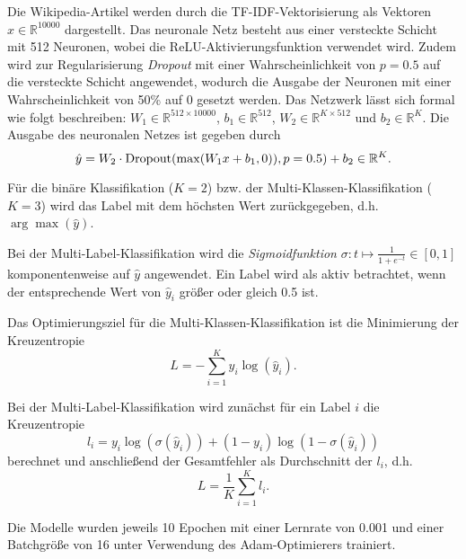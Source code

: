 Die Wikipedia-Artikel werden durch die TF-IDF-Vektorisierung als Vektoren $x\in\mathbb{R}^{10000}$ dargestellt. Das neuronale Netz besteht aus einer versteckte Schicht mit 512 Neuronen, wobei die ReLU-Aktivierungsfunktion verwendet wird. Zudem wird zur Regularisierung \textit{Dropout} mit einer Wahrscheinlichkeit von $p=0.5$ auf die versteckte Schicht angewendet, wodurch die Ausgabe der Neuronen mit einer Wahrscheinlichkeit von 50\% auf 0 gesetzt werden. Das Netzwerk lässt sich formal wie folgt beschreiben: $W_1\in\mathbb{R}^{512\times 10000}$, $b_1\in\mathbb{R}^{512}$, $W_2\in\mathbb{R}^{K\times 512}$ und $b_2\in\mathbb{R}^{K}$. Die Ausgabe des neuronalen Netzes ist gegeben durch
\begin{equation*}
    \hat{y} = W_2\cdot \operatorname*{Dropout}(\max(W_1x + b_1, 0)), p=0.5) + b_2\in\mathbb{R}^{K}.
\end{equation*}

Für die binäre Klassifikation ($K=2$) bzw. der Multi-Klassen-Klassifikation ($K=3$) wird das Label mit dem höchsten Wert zurückgegeben, d.h. $\arg\max (\hat{y})$.

Bei der Multi-Label-Klassifikation wird die \textit{Sigmoidfunktion} $\sigma\colon t\mapsto \frac{1}{1 + e^{-t}}\in [0, 1]$ komponentenweise auf $\hat{y}$ angewendet. Ein Label wird als aktiv betrachtet, wenn der entsprechende Wert von $\hat{y}_i$ größer oder gleich 0.5 ist.

Das Optimierungsziel für die Multi-Klassen-Klassifikation ist die Minimierung der Kreuzentropie
\begin{equation*}
    L = - \sum_{i=1}^{K}y_i\log(\hat{y}_i).
\end{equation*}

Bei der Multi-Label-Klassifikation wird zunächst für ein Label $i$ die Kreuzentropie
\begin{equation*}
    l_i = y_i\log (\sigma(\hat{y}_i)) + (1 - y_i)\log (1 - \sigma(\hat{y}_i))
\end{equation*}
berechnet und anschließend der Gesamtfehler als Durchschnitt der $l_i$, d.h.
\begin{equation*}
    L = \frac{1}{K}\sum_{i=1}^{K} l_i.
\end{equation*}

Die Modelle wurden jeweils 10 Epochen mit einer Lernrate von 0.001 und einer Batchgröße von 16 unter Verwendung des Adam-Optimierers trainiert.
